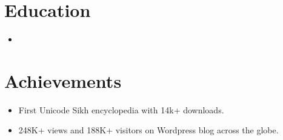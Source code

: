 \documentclass[10.1pt,a4paper,sans]{moderncv}        %
\begin{document}
\section{Education}

\vspace{3pt}

\begin{itemize}

\item{}



\end{itemize}

\section{Achievements}

\vspace{3pt}

\begin{itemize}

\item First Unicode Sikh encyclopedia with 14k+ downloads.
\item 248K+ views and 188K+ visitors on Wordpress blog across the globe.

\end{itemize}

\nocite{*}



\end{document}

